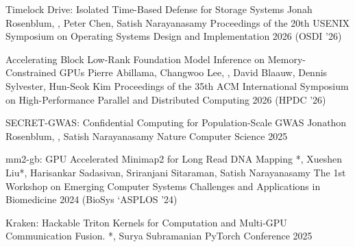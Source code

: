 \PubItem
{Timelock Drive: Isolated Time-Based Defense for Storage Systems} %
{Jonah Rosenblum, , Peter Chen, Satish Narayanasamy} %
{Proceedings of the 20th USENIX Symposium on Operating Systems Design and Implementation} %
{2026} %
{(OSDI '26)} %
{} %


\PubItemCV
{Accelerating Block Low-Rank Foundation Model Inference on Memory-Constrained GPUs} %
{Pierre Abillama, Changwoo Lee, , David Blaauw, Dennis Sylvester, Hun-Seok Kim} %
{Proceedings of the 35th ACM International Symposium on High-Performance Parallel and Distributed Computing} %
{2026} %
{(HPDC '26)} %
{} %


\PubListEnd




\PubItem
{SECRET-GWAS: Confidential Computing for Population-Scale GWAS} %
{Jonathon Rosenblum, , Satish Narayanasamy} %
{Nature Computer Science} %
{2025} %
{} %
{} %


\PubListEnd



\PubItemCV
{mm2-gb: GPU Accelerated Minimap2 for Long Read DNA Mapping} %
{*, Xueshen Liu*, Harisankar Sadasivan, Sriranjani Sitaraman, Satish Narayanasamy} %
{The 1st Workshop on
Emerging Computer Systems Challenges and Applications in Biomedicine} %
{2024} %
{(BioSys \char`\@ ASPLOS '24)} %
{} %

\PubListEnd


\PubItemCV
{Kraken: Hackable Triton Kernels for Computation and Multi-GPU Communication Fusion.} 
{*, Surya Subramanian} %
{PyTorch Conference} %
{2025} %
{} %
{} %

